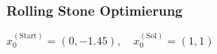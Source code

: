 \begin{frame}[<+->]
\frametitle{Rolling Stone Optimierung}
\begin{minipage}[c]{0.49\textwidth}
\centering
 
\end{minipage}
\hfill
\begin{minipage}[c]{0.49\textwidth}
\centering
  
\end{minipage}
\centering
$
x_0^{(\text{Start})} = (0,-1.45),\quad x_0^{(\text{Sol})}=(1,1) 
$

\end{frame}


